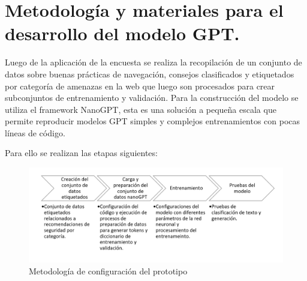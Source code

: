 \section{Metodología y materiales para el desarrollo del modelo GPT.}\label{section:Metodología y materiales para el desarrollo del modelo GPT} 
Luego de la aplicación de la encuesta se realiza la recopilación de un conjunto de datos sobre buenas prácticas de navegación, consejos clasificados y etiquetados por categoría de amenazas en la web que luego son procesados para crear subconjuntos de entrenamiento y validación.
Para la construcción del modelo se utiliza el framework NanoGPT, esta es una solución a pequeña escala que permite reproducir modelos GPT simples y complejos entrenamientos con pocas líneas de código. \cite{Yang2020}

Para ello se realizan las etapas siguientes:
\begin{figure}[H]
	\centering %
	\includegraphics[width=\linewidth]{./doc/04Métodología de configuración del prototipo.png} 
	\caption{Metodología de configuración del prototipo \cite{}}
	\label{figure:Metodología de prototipado}  %
\end{figure}
   


